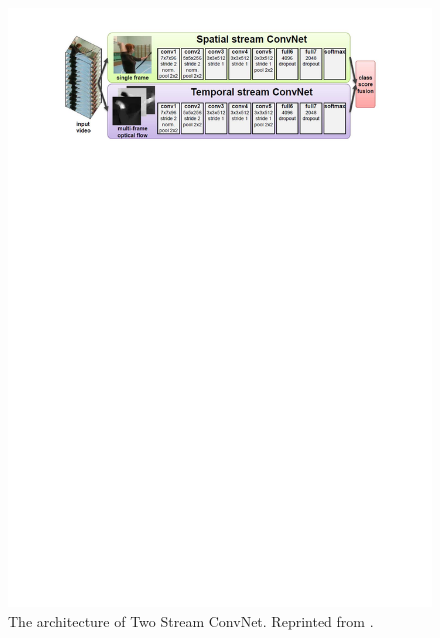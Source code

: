 \begin{figure}
	\includegraphics[trim=2cm 23cm 0cm 1cm]{figs/tsconvnet.pdf}
	\caption{The architecture of Two Stream ConvNet. Reprinted from \cite{simonyan2014}.}
	\label{fig:tsconvnet_1}
\end{figure}
   

